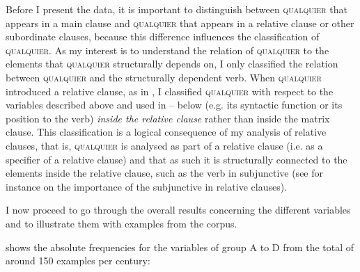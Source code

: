 Before I present the data, it is important to distinguish between \textsc{qualquier} that appears in a main clause and \textsc{qualquier} that appears in a relative clause or other subordinate clauses, because this difference influences the classification of \textsc{qualquier}. As my interest is to understand the relation of \textsc{qualquier} to the elements that \textsc{qualquier} structurally depends on, I only classified the relation between \textsc{qualquier} and the structurally dependent verb. When \textsc{qualquier} introduced a relative clause, as in , I classified \textsc{qualquier} with respect to the variables described above and used in – below (e.g. its syntactic function or its position to the verb) \textit{inside the relative clause} rather than inside the matrix clause. This classification is a logical consequence of my analysis of relative clauses, that is, \textsc{qualquier} is analysed as part of a relative clause (i.e. as a specifier of a relative clause) and that as such it is structurally connected to the elements inside the relative clause, such as the verb in subjunctive (see for instance \citealt{Quer2000} on the importance of the subjunctive in relative clauses).

\largerpage
I now proceed to go through the overall results concerning the different variables and to illustrate them with examples from the corpus.

 shows the absolute frequencies for the variables of group A to D from the total of around 150 examples per century:

